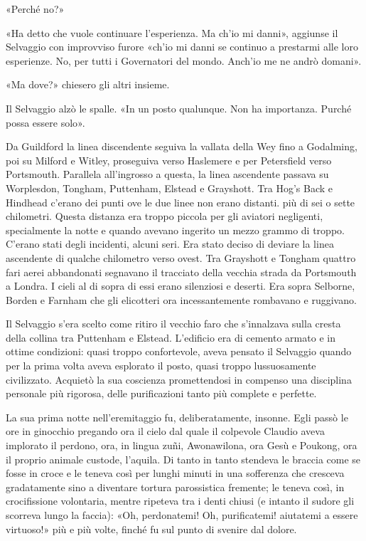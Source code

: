 \documentclass[
a5paper, %
10pt, %
twoside, 
onecolumn, %
openany, %
]{memoir}
\begin{document}
«Perché no?»

«Ha detto che vuole continuare l’esperienza. Ma ch’io mi danni», aggiunse il Selvaggio con improvviso furore «ch’io mi danni se continuo a prestarmi alle loro esperienze. No, per tutti i Governatori del mondo. Anch’io me ne andrò domani».

«Ma dove?» chiesero gli altri insieme.

Il Selvaggio alzò le spalle. «In un posto qualunque. Non ha importanza. Purché possa essere solo».

Da Guildford la linea discendente seguiva la vallata della Wey fino a Godalming, poi su Milford e Witley, proseguiva verso Haslemere e per Petersfield verso Portsmouth. Parallela all’ingrosso a questa, la linea ascendente passava su Worplesdon, Tongham, Puttenham, Elstead e Grayshott. Tra Hog’s Back e Hindhead c’erano dei punti ove le due linee non erano distanti. più di sei o sette chilometri. Questa distanza era troppo piccola per gli aviatori negligenti, specialmente la notte e quando avevano ingerito un mezzo grammo di troppo. C’erano stati degli incidenti, alcuni seri. Era stato deciso di deviare la linea ascendente di qualche chilometro verso ovest. Tra Grayshott e Tongham quattro fari aerei abbandonati segnavano il tracciato della vecchia strada da Portsmouth a Londra. I cieli al di sopra di essi erano silenziosi e deserti. Era sopra Selborne, Borden e Farnham che gli elicotteri ora incessantemente rombavano e ruggivano.

Il Selvaggio s’era scelto come ritiro il vecchio faro che s’innalzava sulla cresta della collina tra Puttenham e Elstead. L’edificio era di cemento armato e in ottime condizioni: quasi troppo confortevole, aveva pensato il Selvaggio quando per la prima volta aveva esplorato il posto, quasi troppo lussuosamente civilizzato. Acquietò la sua coscienza promettendosi in compenso una disciplina personale più rigorosa, delle purificazioni tanto più complete e perfette.

La sua prima notte nell’eremitaggio fu, deliberatamente, insonne. Egli passò le ore in ginocchio pregando ora il cielo dal quale il colpevole Claudio aveva implorato il perdono, ora, in lingua zuñi, Awonawilona, ora Gesù e Poukong, ora il proprio animale custode, l’aquila. Di tanto in tanto stendeva le braccia come se fosse in croce e le teneva così per lunghi minuti in una sofferenza che cresceva gradatamente sino a diventare tortura parossistica fremente; le teneva così, in crocifissione volontaria, mentre ripeteva tra i denti chiusi (e intanto il sudore gli scorreva lungo la faccia): «Oh, perdonatemi! Oh, purificatemi! aiutatemi a essere virtuoso!» più e più volte, finché fu sul punto di svenire dal dolore.
\end{document}
